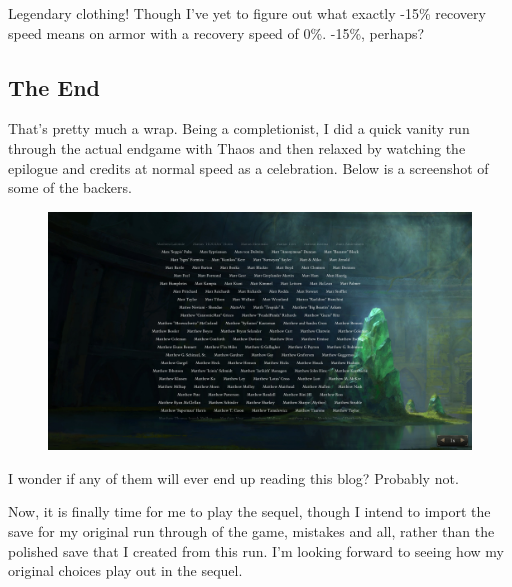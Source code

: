 \documentclass{article}
\begin{document}
Legendary clothing!  Though I've yet to figure out what exactly -15\% recovery speed means on armor with a recovery speed of 0\%.  -15\%, perhaps?

\subsection{The End}

That's pretty much a wrap.  Being a completionist, I did a quick vanity run through the actual endgame with Thaos and then relaxed by watching the epilogue and credits at normal speed as a celebration.  Below is a screenshot of some of the backers.

\begin{figure}
\includegraphics[scale=0.33]{files/blog/2020_01_18_poe_potd_wmpt2/2020_01_18_credits.jpg}
\end{figure}

I wonder if any of them will ever end up reading this blog?  Probably not.

Now, it is finally time for me to play the sequel, though I intend to import the save for my original run through of the game, mistakes and all, rather than the polished save that I created from this run.  I'm looking forward to seeing how my original choices play out in the sequel.


\end{document}
